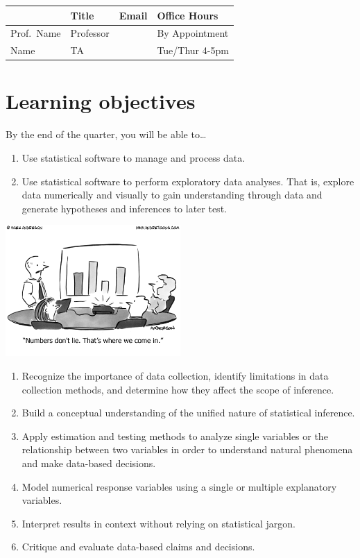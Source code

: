 \documentclass[
  letterpaper,
  DIV=11,
  numbers=noendperiod]{scrreprt}
\providecommand{\tightlist}{%
  \setlength{\itemsep}{0pt}\setlength{\parskip}{0pt}}\usepackage{longtable,booktabs,array}
\begin{document}
\begin{longtable}[]{@{}llll@{}}
\toprule()
& Title & Email & Office Hours \\
\midrule()
\endhead
Prof.~Name & Professor & & By Appointment \\
Name & TA & & Tue/Thur 4-5pm \\
\bottomrule()
\end{longtable}

\hypertarget{learning-objectives}{%
\section*{Learning objectives}\label{learning-objectives}}

By the end of the quarter, you will be able to\ldots{}

\begin{enumerate}
\def\labelenumi{\arabic{enumi}.}
\tightlist
\item
  Use statistical software to manage and process data.
\item
  Use statistical software to perform exploratory data analyses. That
  is, explore data numerically and visually to gain understanding
  through data and generate hypotheses and inferences to later test.
\end{enumerate}

\includegraphics[width=0.5\textwidth,height=\textheight]{images/cartoon3308.png}

\begin{enumerate}
\def\labelenumi{\arabic{enumi}.}
\setcounter{enumi}{2}
\tightlist
\item
  Recognize the importance of data collection, identify limitations in
  data collection methods, and determine how they affect the scope of
  inference.
\item
  Build a conceptual understanding of the unified nature of statistical
  inference.
\item
  Apply estimation and testing methods to analyze single variables or
  the relationship between two variables in order to understand natural
  phenomena and make data-based decisions.
\item
  Model numerical response variables using a single or multiple
  explanatory variables.
\item
  Interpret results in context without relying on statistical jargon.
\item
  Critique and evaluate data-based claims and decisions.
\end{enumerate}
\end{document}
